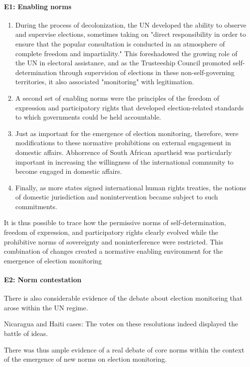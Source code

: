 \paragraph{E1: Enabling norms}
\begin{enumerate}
    \item During the process of decolonization, the UN developed the ability to observe and supervise elections, sometimes taking on "direct responsibility in order to ensure that the popular consultation is conducted in an atmosphere of complete freedom and impartiality." This foreshadowed the growing role of the UN in electoral assistance, and as the Trusteeship Council promoted self-determination through supervision of elections in these non-self-governing territories, it also associated "monitoring" with legitimation.
    \item A second set of enabling norms were the principles of the freedom of expression and participatory rights that developed election-related standards to which governments could be held accountable.
    \item Just as important for the emergence of election monitoring, therefore, were modifications to these normative prohibitions on external engagement in domestic affairs. Abhorrence of South African apartheid was particularly important in increasing the willingness of the international community to become engaged in domestic affairs.
    \item Finally, as more states signed international human rights treaties, the notions of domestic jurisdiction and nonintervention became subject to such commitments.
\end{enumerate}
It is thus possible to trace how the permissive norms of self-determination, freedom of expression, and participatory rights clearly evolved while the prohibitive norms of sovereignty and noninterference were restricted. This combination of changes created a normative enabling environment for the emergence of election monitoring

\paragraph{E2: Norm contestation}
There is also considerable evidence of the debate about election monitoring that arose within the UN regime.

Nicaragua and Haiti cases: The votes on these resolutions indeed displayed the battle of ideas.

There was thus ample evidence of a real debate of core norms within the context of the emergence of new norms on election monitoring.

